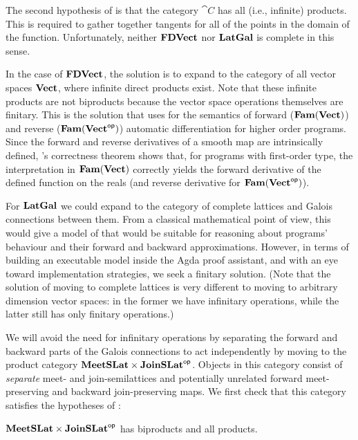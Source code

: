 The second hypothesis of  is that the category
$\cat{C}$ has all (i.e., infinite) products. This is required to
gather together tangents for all of the points in the domain of the
function. Unfortunately, neither $\mathbf{FDVect}$ nor $\mathbf{LatGal}$ is complete
in this sense.

In the case of $\mathbf{FDVect}$, the solution is to expand to the category
of all vector spaces $\mathbf{Vect}$, where infinite direct products
exist. Note that these infinite products are not biproducts because
the vector space operations themselves are finitary. This is the
solution that \cite{vakar22} uses for the semantics of forward
($\mathbf{Fam}(\mathbf{Vect})$) and reverse ($\mathbf{Fam}(\mathbf{Vect}^{\mathsf{op}})$) automatic
differentiation for higher order programs. Since the forward and
reverse derivatives of a smooth map are intrinsically defined,
\citet{vakar22}'s correctness theorem shows that, for programs with
first-order type, the interpretation in $\mathbf{Fam}(\mathbf{Vect})$ correctly yields
the forward derivative of the defined function on the reals (and
reverse derivative for $\mathbf{Fam}(\mathbf{Vect}^{\mathsf{op}})$).

For $\mathbf{LatGal}$ we could expand to the category of complete lattices and
Galois connections between them. From a classical mathematical point
of view, this would give a model of \GPS that would be suitable for
reasoning about programs' behaviour and their forward and backward
approximations. However, in terms of building an executable model
inside the Agda proof assistant, and with an eye toward implementation
strategies, we seek a finitary solution. (Note that the solution of
moving to complete lattices is very different to moving to arbitrary
dimension vector spaces: in the former we have infinitary operations,
while the latter still has only finitary operations.)

We will avoid the need for infinitary operations by separating the
forward and backward parts of the Galois connections to act
independently by moving to the product category
$\mathbf{MeetSLat} \times \mathbf{JoinSLat}^{\mathsf{op}}$. Objects in this category consist of
\emph{separate} meet- and join-semilattices and potentially unrelated
forward meet-preserving and backward join-preserving maps. We first
check that this category satisfies the hypotheses of
:

\begin{proposition}
  $\mathbf{MeetSLat} \times \mathbf{JoinSLat}^{\mathsf{op}}$ has biproducts and all products.
\end{proposition}

